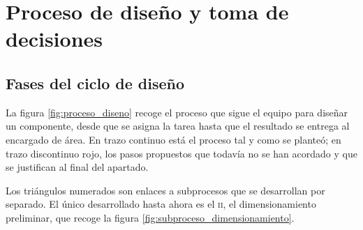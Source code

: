 \chapter{Proceso de diseño y toma de decisiones}
\label{ch:proceso_diseno}

\begin{objetivos}
  \item {}
  \item {}
  \item {}
\end{objetivos}


\section{Fases del ciclo de diseño}
\label{sec:proceso_diseno:01}

La figura \ref{fig:proceso_diseno} recoge el proceso que sigue el equipo para
diseñar un componente, desde que se asigna la tarea hasta que el resultado se
entrega al encargado de área. En trazo continuo está el proceso tal y como se
planteó; en trazo discontinuo rojo, los pasos propuestos que todavía no se han
acordado y que se justifican al final del apartado.

Los triángulos numerados son enlaces a subprocesos que se desarrollan por
separado. El único desarrollado hasta ahora es el \textsc{ii}, el
dimensionamiento preliminar, que recoge la figura
\ref{fig:subproceso_dimensionamiento}.

